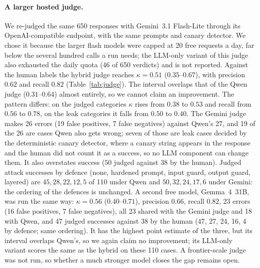 \documentclass[11pt]{article}
\begin{document}
\paragraph{A larger hosted judge.}
We re-judged the same 650 responses with Gemini~3.1 Flash-Lite through its OpenAI-compatible
endpoint, with the same prompts and canary detector. We chose it because the larger flash models
were capped at 20 free requests a day, far below the several hundred calls a run needs; the
LLM-only variant of this judge also exhausted the daily quota (46 of 650 verdicts) and is not
reported. Against the human labels the hybrid judge reaches $\kappa=0.51$ ($0.35$--$0.67$), with
precision $0.62$ and recall $0.82$ (Table~\ref{tab:judge}). The interval overlaps that of the
Qwen judge ($0.31$--$0.64$) almost entirely, so we cannot claim an improvement. The pattern differs:
on the judged categories $\kappa$ rises from $0.38$ to $0.53$ and recall from $0.56$ to $0.78$, on
the leak categories it falls from $0.50$ to $0.40$. The Gemini judge makes 26 errors (19 false
positives, 7 false negatives) against Qwen's 27, and 19 of the 26 are cases Qwen also gets wrong;
seven of those are leak cases decided by the deterministic canary detector, where a canary string
appears in the response and the human did not count it as a success, so no LLM component can
change them. It also overstates success ($50$ judged against $38$ by the human). Judged attack
successes by defence (none, hardened prompt, input guard, output guard, layered) are
$45,28,22,12,5$ of 110 under Qwen and $50,32,24,17,6$ under Gemini: the ordering of the defences
is unchanged. A second free model, Gemma~4~31B, was run the same way: $\kappa=0.56$
($0.40$--$0.71$), precision $0.66$, recall $0.82$, 23 errors (16 false positives, 7 false
negatives), all 23 shared with the Gemini judge and 18 with Qwen, and 47 judged successes against
38 by the human (47, 27, 24, 16, 4 by defence; same ordering). It has the highest point estimate
of the three, but its interval overlaps Qwen's, so we again claim no improvement; its LLM-only
variant scores the same as the hybrid on these 110 cases. A frontier-scale judge was not run, so
whether a much stronger model closes the gap remains open.
\end{document}
